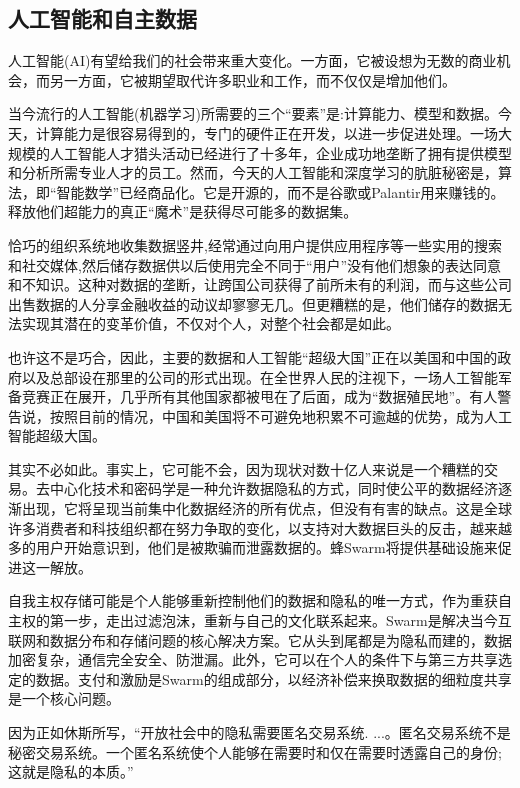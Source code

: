 \subsection{人工智能和自主数据\statusgreen} \label{sec:AIdata}

人工智能(AI)有望给我们的社会带来重大变化。一方面，它被设想为无数的商业机会，而另一方面，它被期望取代许多职业和工作，而不仅仅是增加他们\cite{Lee2018Sep}。

当今流行的人工智能(机器学习)所需要的三个“要素”是:计算能力、模型和数据。今天，计算能力是很容易得到的，专门的硬件正在开发，以进一步促进处理。一场大规模的人工智能人才猎头活动已经进行了十多年，企业成功地垄断了拥有提供模型和分析所需专业人才的员工。然而，今天的人工智能和深度学习的肮脏秘密是，算法，即“智能数学”已经商品化。它是开源的，而不是谷歌或Palantir用来赚钱的。释放他们超能力的真正“魔术”是获得尽可能多的数据集。

恰巧的组织系统地收集数据竖井,经常通过向用户提供应用程序等一些实用的搜索和社交媒体,然后储存数据供以后使用完全不同于“用户”没有他们想象的表达同意和不知识。这种对数据的垄断，让跨国公司获得了前所未有的利润，而与这些公司出售数据的人分享金融收益的动议却寥寥无几。但更糟糕的是，他们储存的数据无法实现其潜在的变革价值，不仅对个人，对整个社会都是如此。

也许这不是巧合，因此，主要的数据和人工智能“超级大国”正在以美国和中国的政府以及总部设在那里的公司的形式出现。在全世界人民的注视下，一场人工智能军备竞赛正在展开，几乎所有其他国家都被甩在了后面，成为“数据殖民地”\cite{HarariDavos2020Mar}。有人警告说，按照目前的情况，中国和美国将不可避免地积累不可逾越的优势，成为人工智能超级大国\cite{Lee2018Sep}。

其实不必如此。事实上，它可能不会，因为现状对数十亿人来说是一个糟糕的交易。去中心化技术和密码学是一种允许数据隐私的方式，同时使公平的数据经济逐渐出现，它将呈现当前集中化数据经济的所有优点，但没有有害的缺点。这是全球许多消费者和科技组织都在努力争取的变化，以支持对大数据巨头的反击，越来越多的用户开始意识到，他们是被欺骗而泄露数据的。蜂Swarm将提供基础设施来促进这一解放。

自我主权存储可能是个人能够重新控制他们的数据和隐私的唯一方式，作为重获自主权的第一步，走出过滤泡沫，重新与自己的文化联系起来。Swarm是解决当今互联网和数据分布和存储问题的核心解决方案。它从头到尾都是为隐私而建的，数据加密复杂，通信完全安全、防泄漏。此外，它可以在个人的条件下与第三方共享选定的数据。支付和激励是Swarm的组成部分，以经济补偿来换取数据的细粒度共享是一个核心问题。

因为正如休斯所写，“开放社会中的隐私需要匿名交易系统. ...。匿名交易系统不是秘密交易系统。一个匿名系统使个人能够在需要时和仅在需要时透露自己的身份;这就是隐私的本质。”

